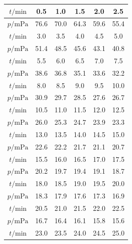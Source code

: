 \documentclass[a4paper,fontset=windows]{ctexart}
\begin{document}
    \begin{center}
    \begin{minipage}{0.45\textwidth}
        \begin{tabular}{|c|c|c|c|c|c|}
            \hline
            $t/\mathrm{min}$ & 0.5 & 1.0 & 1.5 & 2.0 & 2.5 \\
            \hline
            $p/\mathrm{mPa}$ & 76.6 & 70.0 & 64.3 & 59.6 & 55.4 \\
            \hline
            $t/\mathrm{min}$ & 3.0 & 3.5 & 4.0 & 4.5 & 5.0 \\
            \hline
            $p/\mathrm{mPa}$ & 51.4 & 48.5 & 45.6 & 43.1 & 40.8 \\
            \hline
            $t/\mathrm{min}$ & 5.5 & 6.0 & 6.5 & 7.0 & 7.5 \\
            \hline
            $p/\mathrm{mPa}$ & 38.6 & 36.8 & 35.1 & 33.6 & 32.2 \\
            \hline
            $t/\mathrm{min}$ & 8.0 & 8.5 & 9.0 & 9.5 & 10.0 \\
            \hline
            $p/\mathrm{mPa}$ & 30.9 & 29.7 & 28.5 & 27.6 & 26.7 \\
            \hline
            $t/\mathrm{min}$ & 10.5 & 11.0 & 11.5 & 12.0 & 12.5 \\
            \hline
            $p/\mathrm{mPa}$ & 26.0 & 25.3 & 24.7 & 23.9 & 23.3 \\
            \hline
            $t/\mathrm{min}$ & 13.0 & 13.5 & 14.0 & 14.5 & 15.0 \\
            \hline
            $p/\mathrm{mPa}$ & 22.6 & 22.2 & 21.7 & 21.1 & 20.7 \\
            \hline
            $t/\mathrm{min}$ & 15.5 & 16.0 & 16.5 & 17.0 & 17.5 \\
            \hline
            $p/\mathrm{mPa}$ & 20.2 & 19.7 & 19.4 & 19.1 & 18.7 \\
            \hline
            $t/\mathrm{min}$ & 18.0 & 18.5 & 19.0 & 19.5 & 20.0 \\
            \hline
            $p/\mathrm{mPa}$ & 18.3 & 17.9 & 17.6 & 17.3 & 16.9 \\
            \hline
            $t/\mathrm{min}$ & 20.5 & 21.0 & 21.5 & 22.0 & 22.5 \\
            \hline
            $p/\mathrm{mPa}$ & 16.7 & 16.4 & 16.1 & 15.8 & 15.6 \\
            \hline
            $t/\mathrm{min}$ & 23.0 & 23.5 & 24.0 & 24.5 & 25.0 \\
            \hline

\end{tabular}
\end{minipage}
\end{center}
\end{document}

